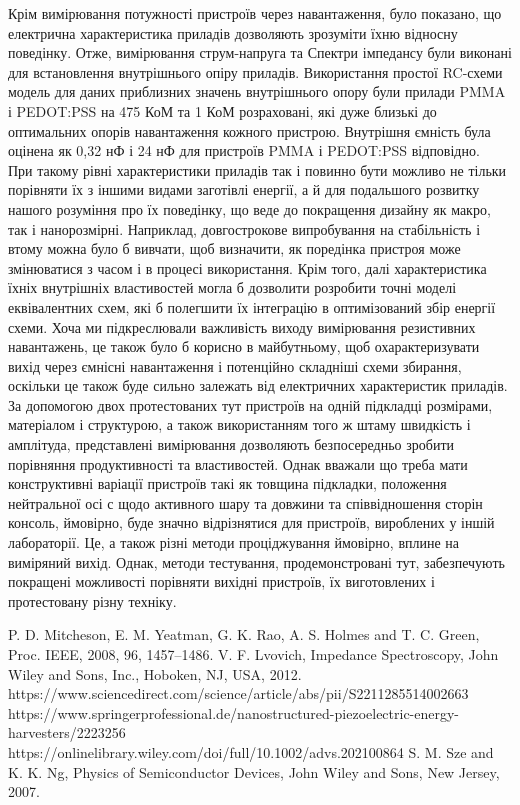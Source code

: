 \documentclass[a4paper,14pt]{extreport}
\begin{document}
Крім вимірювання потужності пристроїв через навантаження,
було показано, що електрична характеристика приладів
дозволяють зрозуміти їхню відносну поведінку. Отже, вимірювання струм-напруга та
Спектри імпедансу були виконані для встановлення
внутрішнього опіру приладів. Використання простої RC-схеми
модель для даних приблизних значень внутрішнього опору
були прилади PMMA і PEDOT:PSS на 475 КоМ та 1 КоМ
розраховані, які дуже близькі до оптимальних опорів навантаження
кожного пристрою. Внутрішня ємність була оцінена як
0,32 нФ і 24 нФ для пристроїв PMMA і PEDOT:PSS
відповідно.\\ 

При такому рівні характеристики приладів так і повинно бути
можливо не тільки порівняти їх з іншими видами заготівлі енергії, а й для подальшого розвитку нашого розуміння про їх
поведінку, що веде до покращення дизайну як макро, так і
нанорозмірні. Наприклад, довгострокове випробування на стабільність і втому
можна було б вивчати, щоб визначити, як поредінка пристроя
може змінюватися з часом і в процесі використання. Крім того, далі
характеристика їхніх внутрішніх властивостей могла б дозволити розробити точні моделі еквівалентних схем, які б
полегшити їх інтеграцію в оптимізований збір енергії
схеми. Хоча ми підкреслювали важливість виходу
вимірювання резистивних навантажень, це також було б корисно
в майбутньому, щоб охарактеризувати вихід через ємнісні навантаження і
потенційно складніші схеми збирання, оскільки це також буде
сильно залежать від електричних характеристик приладів.
За допомогою двох протестованих тут пристроїв на одній підкладці
розмірами, матеріалом і структурою, а також використанням того ж штаму
швидкість і амплітуда, представлені вимірювання дозволяють безпосередньо зробити 
порівняння продуктивності та властивостей. Однак  вважали що  треба  мати  конструктивні варіації пристроїв такі
як товщина підкладки, положення нейтральної осі с
щодо активного шару та довжини та співвідношення сторін
консоль, ймовірно, буде значно відрізнятися для пристроїв, вироблених у іншій лабораторії. Це, а також різні методи проціджування
ймовірно, вплине на виміряний вихід. Однак,
методи тестування, продемонстровані тут, забезпечують покращені можливості
порівняти вихідні пристроїв, їх виготовлених і протестовану різну техніку.

\begin{thebibliography}{9}
 P. D. Mitcheson, E. M. Yeatman, G. K. Rao, A. S. Holmes and
T. C. Green, Proc. IEEE, 2008, 96, 1457–1486.
 V. F. Lvovich, Impedance Spectroscopy, John Wiley and Sons,
Inc., Hoboken, NJ, USA, 2012.
 https://www.sciencedirect.com/science/article/abs/pii/S2211285514002663
 https://www.springerprofessional.de/nanostructured-piezoelectric-energy-harvesters/2223256
 https://onlinelibrary.wiley.com/doi/full/10.1002/advs.202100864
 S. M. Sze and K. K. Ng, Physics of Semiconductor Devices, John
Wiley and Sons, New Jersey, 2007.
 

\end{thebibliography}
\end{document}
